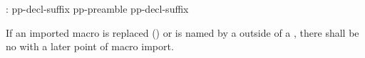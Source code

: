 \begin{after}\color{addclr}
\begin{std.txt}
\begin{bnf}
:\br
   pp-decl-suffix \terminal{;}\br
  pp-preamble \opt{}  pp-decl-suffix \terminal{;}
\end{bnf}

\alinea
If an imported macro is replaced ()
or is named by a 
outside of a ,
there shall be no  with a
later point of macro import.

\end{std.txt}

\end{after}
